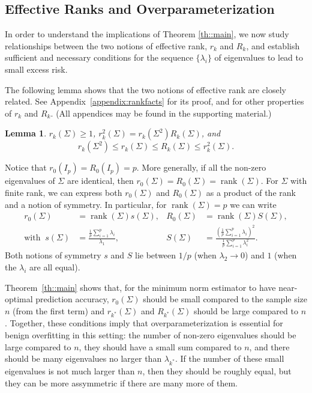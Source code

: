 \documentclass[11pt,notitlepage]{article}
\newcommand\rank {\ensuremath{\operatorname{\mathrm{rank}}}}
\newtheorem{lemma}[theorem]{Lemma}
\begin{document}
\subsection{Effective Ranks and Overparameterization}

In order to understand the implications of Theorem \ref{th::main}, 
we now study relationships between the two notions of effective rank,
$r_k$ and $R_k$, and establish sufficient and necessary conditions for
the sequence $\{\lambda_i\}$ of eigenvalues to lead to small excess risk.

The following lemma shows that the two notions of effective rank are closely
related. See Appendix~\ref{appendix:rankfacts} for its proof, and for
other properties of $r_k$ and $R_k$.  (All appendices may be found in 
the supporting material.)

\begin{lemma}\label{lemma:rkRkordering}
  $r_k(\Sigma)\ge 1$, $r^2_k(\Sigma)=r_k(\Sigma^2)R_k(\Sigma)$, and
    \[
      r_k(\Sigma^2) \le r_k(\Sigma) \le R_k(\Sigma) \le r_k^2(\Sigma).
    \]
\end{lemma}

Notice that $r_0(I_p)=R_0(I_p)=p$. More generally, if all the non-zero
eigenvalues of $\Sigma$ are identical, then
$r_0(\Sigma)=R_0(\Sigma)=\rank(\Sigma)$.
For $\Sigma$ with finite rank, we can express both $r_0(\Sigma)$
and $R_0(\Sigma)$ as a product of the rank and a notion of symmetry.
In particular, for $\rank(\Sigma)=p$ we can write
  \begin{align*}
    r_0(\Sigma) &= \rank(\Sigma) s(\Sigma), &
    R_0(\Sigma) &= \rank(\Sigma) S(\Sigma), \\
\text{with} \;\;
    s(\Sigma) &= \frac{\frac{1}{p} \sum_{i=1}^p\lambda_i}{\lambda_1}, &
    S(\Sigma) &= \frac{\left(\frac{1}{p}\sum_{i=1}^p\lambda_i\right)^2}
        {\frac{1}{p}\sum_{i=1}^p\lambda_i^2}.
  \end{align*}
Both notions of symmetry $s$ and $S$ lie between $1/p$ (when
$\lambda_2\to 0$) and $1$ (when the $\lambda_i$ are all equal).

Theorem~\ref{th::main} shows that, for the minimum norm estimator
to have near-optimal prediction accuracy, $r_0(\Sigma)$ should be
small compared to the sample size $n$ (from the first term) and
$r_{k^*}(\Sigma)$ and $R_{k^*}(\Sigma)$ should be large compared to
$n$. Together, these conditions imply that overparameterization is
essential for benign overfitting in this setting: the number of
non-zero eigenvalues should be large compared to $n$, they should
have a small sum
compared to $n$, and there should be many eigenvalues no larger
than $\lambda_{k^*}$.  If the number of these small eigenvalues
is not much larger than $n$, then they should be roughly equal,
but they can be more assymmetric if there are many more of them.
\end{document}
